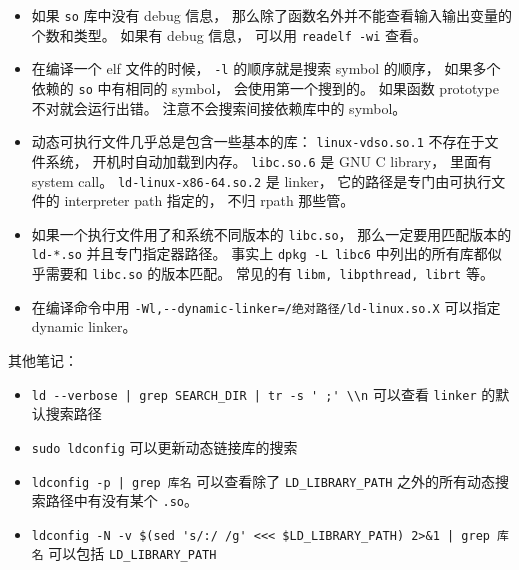 \begin{itemize}
\item 如果 \verb|so| 库中没有 debug 信息， 那么除了函数名外并不能查看输入输出变量的个数和类型。 如果有 debug 信息， 可以用 \verb|readelf -wi| 查看。
\item 在编译一个 elf 文件的时候， \verb|-l| 的顺序就是搜索 symbol 的顺序， 如果多个依赖的 \verb|so| 中有相同的 symbol， 会使用第一个搜到的。 如果函数 prototype 不对就会运行出错。 注意不会搜索间接依赖库中的 symbol。
\item 动态可执行文件几乎总是包含一些基本的库： \verb|linux-vdso.so.1| 不存在于文件系统， 开机时自动加载到内存。 \verb|libc.so.6| 是 GNU C library， 里面有 system call。 \verb|ld-linux-x86-64.so.2| 是 linker， 它的路径是专门由可执行文件的 interpreter path 指定的， 不归 rpath 那些管。
\item 如果一个执行文件用了和系统不同版本的 \verb|libc.so|， 那么一定要用匹配版本的 \verb|ld-*.so| 并且专门指定器路径。 事实上 \verb|dpkg -L libc6| 中列出的所有库都似乎需要和 \verb|libc.so| 的版本匹配。 常见的有 \verb|libm, libpthread, librt| 等。
\item 在编译命令中用 \verb|-Wl,--dynamic-linker=/绝对路径/ld-linux.so.X| 可以指定 dynamic linker。
\end{itemize}

其他笔记：
\begin{itemize}
\item \verb`ld --verbose | grep SEARCH_DIR | tr -s ' ;' \\n` 可以查看 \verb|linker| 的默认搜索路径
\item \verb|sudo ldconfig| 可以更新动态链接库的搜索
\item \verb`ldconfig -p | grep 库名` 可以查看除了 \verb|LD_LIBRARY_PATH| 之外的所有动态搜索路径中有没有某个 \verb|.so|。
\item \verb`ldconfig -N -v $(sed 's/:/ /g' <<< $LD_LIBRARY_PATH) 2>&1 | grep 库名` 可以包括 \verb|LD_LIBRARY_PATH|
\end{itemize}

